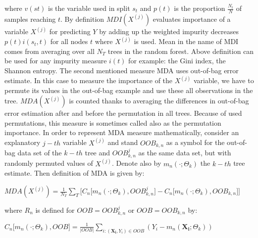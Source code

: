 where $ v(st) $ is the variable used in split $s_{t}$ and $ p(t) $ is the proportion $\frac{N_{t}}{N}$ of samples reaching $t$.
By definition $ MDI( X^{(j)} ) $ evaluates importance of a variable $ X^{(j)} $ for predicting $Y$ by adding up the weighted impurity decreases $p(t)i(s_{t}, t)$ for all nodes $t$ where $ X^{(j)}$ is used. Mean in the name of MDI comes from averaging over all $N_{T}$ trees in the random forest. Above definition can be used for any impurity measure $i(t)$ for example: the Gini index, the Shannon entropy. The second mentioned measure MDA uses out-of-bag error estimate. In this case to measure the importance of the $X^{(j)}$ variable, we have to permute its values in the out-of-bag example and use these all observations in the tree. $ MDA( X^{(j)})$ is counted thanks to averaging the differences in out-of-bag error estimation after and before the permutation in all trees. Because of used permutations, this measure is sometimes called also as the permutation importance. In order to represent MDA measure mathematically, consider an explanatory $j-th$ variable $X^{(j)}$ and stand $OOB_{k,n}$ as a symbol for the out-of-bag data set of the $k-th$ tree and  $OOB_{k,n}^{j}$ as the same data set, but with randomly permuted values of $X^{(j)}$. Denote also by $ m_{n}(\cdot ;\Theta_{k}) $  the $k-th$ tree estimate. Then definition of MDA is given by:

\begin{center}
$ MDA( X^{(j)} ) = \frac{1}{N_{T}}\displaystyle\sum_{T} \Big[C_{n}\big[m_{n}(\cdot ;\Theta_{k}), OOB_{k,n}^{j}\big] - C_{n}\big[m_{n}(\cdot ;\Theta_{k}), OOB_{k,n}\big]   \Big]  $
\end{center}
where $R_{n}$ is defined for $ OOB =  OOB_{k,n}^{j}$ or $OOB =  OOB_{k,n}$ by:
\begin{center}
$C_{n}\big[m_{n}(\cdot ;\Theta_{k}), OOB\big] = \frac{1}{|OOB|} \displaystyle\sum_{ i :( \pmb{X_{i}}, Y_{i} )  \in OOB} (Y_{i} - m_{n}( \pmb{X_{i}} ;\Theta_{k})) $
\end{center}



